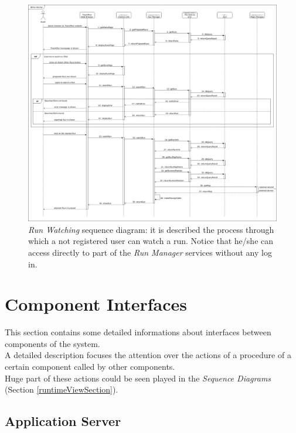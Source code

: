 \begin{figure}[H]
  \begin{center}
  	\includegraphics[width=\textwidth]{./img/sequence/watchRun.png}
    \hspace{0.05\linewidth}
    \centering
    \caption{\textit{Run Watching} sequence diagram: it is described the process through which a not registered user can watch a run. Notice that he/she can access directly to part of the \textit{Run Manager} services without any log in.}
		\label{img:watchRun}
    \end{center}
\end{figure}


\clearpage

\section{Component Interfaces}
This section contains some detailed informations about interfaces between components of the system.\\
A detailed description focuses the attention over the actions of a procedure of a certain component called by other components.\\
Huge part of these actions could be seen played in the \textit{Sequence Diagrams} (Section \ref{runtimeViewSection}).

\subsection{Application Server}

